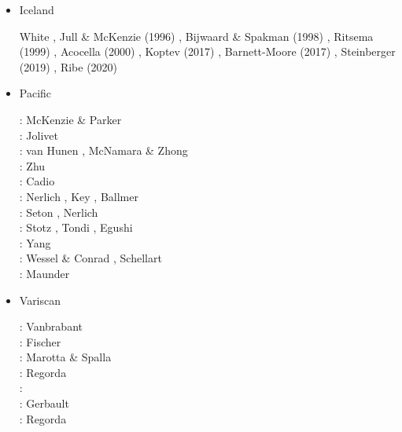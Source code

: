 \begin{itemize}
\item Iceland

\begin{scriptsize}
White \cite{whit89},
Jull \& McKenzie (1996) \cite{jumc96},
Bijwaard \& Spakman  (1998) \cite{bisp98},
Ritsema \etal (1999) \cite{rivw99},
Acocella \etal  (2000) \cite{acgf00},
Koptev \etal (2017) \cite{kocb17},
Barnett-Moore \etal (2017) \cite{bahf17},
Steinberger \etal (2019) \cite{stbl19},
Ribe \etal (2020) \cite{rits20}
\end{scriptsize} 

\item Pacific 

\begin{scriptsize}
\nineteensixtyseven: McKenzie \& Parker \cite{mcpa67}\\
\nineteenninety: Jolivet \etal \cite{jodc90}\\
\twothousandfive: van Hunen \etal \cite{vazs05}, McNamara \& Zhong \cite{mczh05a}\\
\twothousandten: Zhu \etal \cite{zhst10}\\
\twothousandeleven: Cadio \etal \cite{capd11}\\
\twothousandthirteen: Nerlich \etal \cite{necb13}, Key \etal \cite{kecl13}, Ballmer \etal \cite{bacs13}\\
\twothousandfifteen: Seton \etal \cite{sefw15}, Nerlich \etal \cite{necb15}\\
\twothousandseventeen: Stotz \etal \cite{stid17}, Tondi \etal \cite{togr17}, Egushi \cite{egim17}\\
\twothousandeighteen: Yang \etal \cite{yamz18}\\
\twothousandnineteen: Wessel \& Conrad \cite{weco19}, Schellart \etal \cite{sccs19}\\
\twothousandtwenty: Maunder \cite{mapg20}
\end{scriptsize}



\item Variscan 

\begin{scriptsize}
\nineteenninetynine: Vanbrabant \etal \cite{vajh99}\\
\twothousandfour: Fischer \etal \cite{fijj04} \\
\twothousandseven: Marotta \& Spalla \cite{masp07} \\
\twothousandthirteen: Regorda \etal \cite{rems13} \\
\twothousandseventeen: \cite{regorda} \\
\twothousandeighteen: Gerbault \etal \cite{gesr18} \\
\twothousandtwenty: Regorda \etal \cite{relr20}
\end{scriptsize}


\end{itemize}






